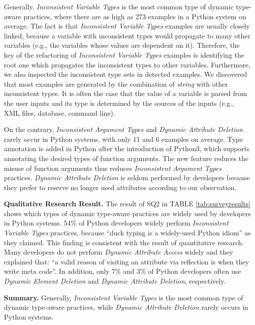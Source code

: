 Generally, \emph{Inconsistent Variable Types} is the most common type of dynamic type-aware practices, where there are as high as 273 examples in a Python system on average. The fact is that \emph{Inconsistent Variable Types} examples are usually closely linked, because a variable with inconsistent types would propagate to many other variables (e.g., the variables whose values are dependent on it). Therefore, the key of the refactoring of \emph{Inconsistent Variable Types} examples is identifying the root one which propagates the inconsistent types to other variables. Furthermore, we also inspected the inconsistent type sets in detected examples. We discovered that most examples are generated by the combination of \textit{string} with other inconsistent types. It is often the case that the value of a variable is parsed from the user inputs and its type is determined by the sources of the inputs (e.g., XML files, database, command line).

On the contrary, \emph{Inconsistent Argument Types} and \emph{Dynamic Attribute Deletion} rarely occur in Python systems, with only 11 and 6 examples on average. Type annotation is added in Python after the introduction of Python3, which supports annotating the desired types of function arguments. The new feature reduces the misuse of function arguments thus reduces \emph{Inconsistent Argument Types} practices. \emph{Dynamic Attribute Deletion} is seldom performed by developers because they prefer to reserve no longer used attributes according to our observation.


\textbf{Qualitative Research Result.} 
The result of SQ2 in TABLE \ref{tab:surveyresults} shows which types of dynamic type-aware practices are widely used by developers in Python systems. 54\% of Python developers widely perform \emph{Inconsistent Variable Types} practices, because ``duck typing is a widely-used Python idiom'' as they claimed. This finding is consistent with the result of quantitative research. 
Many developers do not perform \emph{Dynamic Attribute Access} widely and they explained that: ``a valid reason of visiting an attribute via reflection is when they write meta code''.
In addition, only 7\% and 3\% of Python developers often use \emph{Dynamic Element Deletion} and \emph{Dynamic Attribute Deletion}, respectively.   


\textbf{Summary.} Generally, \emph{Inconsistent Variable Types} is the most common type of dynamic type-aware practices, while \emph{Dynamic Attribute Deletion} rarely occurs in Python systems.

